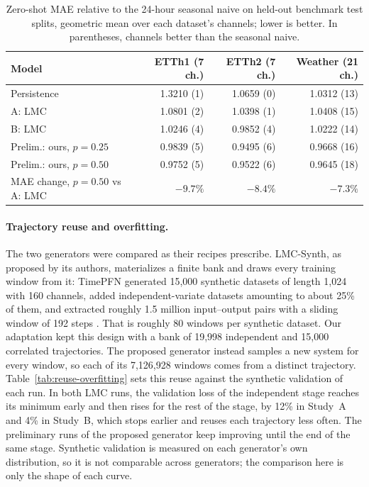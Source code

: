 \begin{table}[H]
\centering\small\setlength{\tabcolsep}{4pt}
\caption{Zero-shot MAE relative to the 24-hour seasonal naive on held-out
benchmark test splits, geometric mean over each dataset's channels; lower is
better. In parentheses, channels better than the seasonal naive.}
\label{tab:benchmark-zero-shot}
\begin{tabular}{lrrr}\toprule
Model & ETTh1 (7 ch.) & ETTh2 (7 ch.) & Weather (21 ch.) \\\midrule
Persistence & 1.3210 (1) & 1.0659 (0) & 1.0312 (13) \\
A: LMC & 1.0801 (2) & 1.0398 (1) & 1.0408 (15) \\
B: LMC & 1.0246 (4) & 0.9852 (4) & 1.0222 (14) \\
Prelim.: ours, $p=0.25$ & 0.9839 (5) & 0.9495 (6) & 0.9668 (16) \\
Prelim.: ours, $p=0.50$ & 0.9752 (5) & 0.9522 (6) & 0.9645 (18) \\\midrule
MAE change, $p=0.50$ vs A: LMC & $-9.7\%$ & $-8.4\%$ & $-7.3\%$ \\\bottomrule
\end{tabular}
\end{table}

\paragraph{Trajectory reuse and overfitting.}
The two generators were compared as their recipes prescribe. LMC-Synth, as
proposed by its authors, materializes a finite bank and draws every training
window from it: TimePFN generated 15,000 synthetic datasets of length 1,024
with 160 channels, added independent-variate datasets amounting to about 25\%
of them, and extracted roughly 1.5 million input--output pairs with a sliding
window of 192 steps \citep[Sec.~4, p.~5 of the arXiv version]{taga2025timepfn}.
That is roughly 80 windows per synthetic dataset. Our adaptation kept this
design with a bank of 19,998 independent and 15,000 correlated trajectories.
The proposed generator instead samples a new system for every window, so each
of its 7,126,928 windows comes from a distinct trajectory.
Table~\ref{tab:reuse-overfitting} sets this reuse against the synthetic
validation of each run. In both LMC runs, the validation loss of the
independent stage reaches its minimum early and then rises for the rest of the
stage, by 12\% in Study~A and 4\% in Study~B, which stops earlier and reuses
each trajectory less often. The preliminary runs of the proposed generator
keep improving until the end of the same stage. Synthetic validation is
measured on each generator's own distribution, so it is not comparable across
generators; the comparison here is only the shape of each curve.


